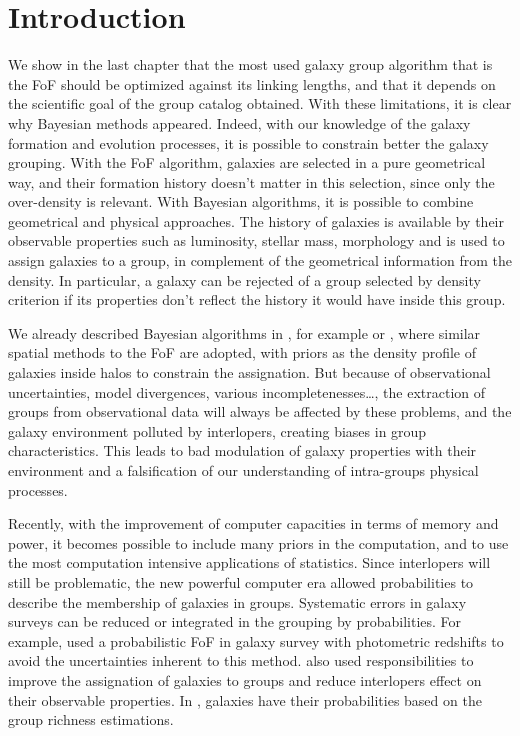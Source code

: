 \section{Introduction}
\label{sec:maggie_introduction}

\newcommand\rvir{r_{\rm vir}}
\newcommand\vvir{v_{\rm vir}}

We show in the last chapter that the most used galaxy group algorithm that is
the FoF should be optimized against its linking lengths, and that it depends on
the scientific goal of the group catalog obtained. With these limitations, it
is clear why Bayesian methods appeared. Indeed, with our knowledge of the
galaxy formation and evolution processes, it is possible to constrain better
the galaxy grouping. With the FoF algorithm, galaxies are selected in a pure
geometrical way, and their formation history doesn't matter in this selection,
since only the over-density is relevant. With Bayesian algorithms, it is
possible to combine geometrical and physical approaches. The history of
galaxies is available by their observable properties such as luminosity,
stellar mass, morphology and is used to assign galaxies to a group, in
complement of the geometrical information from the density. In particular, a
galaxy can be rejected of a group selected by density criterion if its
properties don't reflect the history it would have inside this group.

We already described Bayesian algorithms in
, for example \citet{Yang+07} or
\citet{MunozCuartas+12}, where similar spatial methods to the FoF are adopted,
with priors as the density profile of galaxies inside halos to constrain the
assignation. But because of observational uncertainties, model divergences,
various incompletenesses\ldots, the extraction of groups from observational
data will always be affected by these problems, and the galaxy environment
polluted by interlopers, creating biases in group characteristics. This leads
to bad modulation of galaxy properties with their environment and a
falsification of our understanding of intra-groups physical processes.

Recently, with the improvement of computer capacities in terms of memory and
power, it becomes possible to include many priors in the computation, and to
use the most computation intensive applications of statistics. Since
interlopers will still be problematic, the new powerful computer era allowed
probabilities to describe the membership of galaxies in groups. Systematic
errors in galaxy surveys can be reduced or integrated in the grouping by
probabilities. For example, \citet{Liu+08} used a probabilistic FoF in galaxy
survey with photometric redshifts to avoid the uncertainties inherent to this
method. \citet{DominguezRomero+12} also used responsibilities to improve the
assignation of galaxies to groups and reduce interlopers effect on their
observable properties. In \citet{Rykoff+14}, galaxies have their probabilities
based on the group richness estimations.

